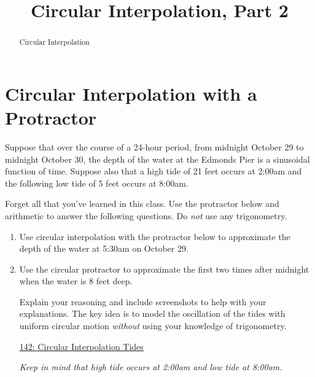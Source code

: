 \documentclass{ximera}
\title{Circular Interpolation, Part 2}
\begin{document}
\begin{abstract}
Circular Interpolation
\end{abstract}
\maketitle


\section{Circular Interpolation with a Protractor}



\begin{example}  \label{E888GGGbdsdsf}
Suppose that over the course of a 24-hour period, from midnight October 29 to midnight October 30, the depth of the water at the Edmonds Pier is a sinusoidal function of time. Suppose also that a high tide of 21 feet occurs at 2:00am and the following low tide of 5 feet occurs at 8:00am. 

Forget all that you've learned in this class. Use the protractor below and arithmetic to answer the following questions. Do \emph{not} use any trigonometry.

\begin{enumerate}
\item Use circular interpolation with the protractor below to approximate the depth of the water at 5:30am on October 29.

\item Use the circular protractor to approximate the first two times after midnight when the water is $8$ feet deep.

Explain your reasoning and include screenshots to help with your explanations. The key idea is to model the oscillation of the tides with uniform circular motion \emph{without} using your knowledge of trigonometry.


\begin{freeResponse}
\end{freeResponse}

\begin{onlineOnly}
    \begin{center}
\end{center}
\end{onlineOnly}

\href{https://www.desmos.com/calculator/0wxwmkzvky}{142: Circular Interpolation Tides}

\emph{Keep in mind that high tide occurs at 2:00am and low tide at 8:00am.}

\end{enumerate}
\end{example}
\end{document}
